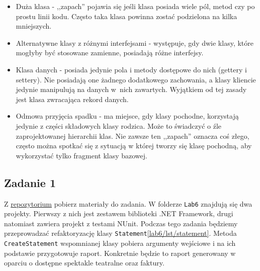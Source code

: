 \begin{itemize}
	\item Duża klasa - ,,zapach'' pojawia się jeśli klasa posiada wiele pól, metod czy po prostu linii kodu. Często taka klasa powinna zostać podzielona na kilka mniejszych.
	\item Alternatywne klasy z różnymi interfejsami - występuje, gdy dwie klasy, które mogłyby być stosowane zamienne, posiadają różne interfejsy. 
	\item Klasa danych - posiada jedynie pola i metody dostępowe do nich (gettery i settery). Nie posiadają one żadnego dodatkowego zachowania, a klasy kliencie jedynie manipulują na danych w~nich zawartych. Wyjątkiem od tej zasady jest klasa zwracająca rekord danych.  
	\item Odmowa przyjęcia spadku - ma miejsce, gdy klasy pochodne, korzystają jedynie z części składowych klasy rodzica. Może to świadczyć o źle zaprojektowanej hierarchii klas. Nie zawsze ten ,,zapach'' oznacza coś złego, często można spotkać się z sytuacją w której tworzy się klasę pochodną, aby wykorzystać tylko fragment klasy bazowej. 
\end{itemize}

\subsection{Zadanie 1}

Z \href{https://gitlab.com/PierreSimonDeLaplace/wsb-zaawansowane-techniki-obiektowe-sources}{repozytorium} pobierz materiały do zadania. W folderze \texttt{Lab6} znajdują się dwa projekty. Pierwszy z nich jest zestawem biblioteki .NET Framework, drugi natomiast zawiera projekt z testami NUnit. Podczas tego zadania będziemy przeprowadzać refaktoryzację klasy \texttt{Statement}\ref{lab6/lst/statement}. Metoda \texttt{CreateStatement} wspomnianej klasy pobiera argumenty wejściowe i na ich podstawie przygotowuje raport. Konkretnie będzie to raport generowany w oparciu o dostępne spektakle teatralne oraz faktury. 

